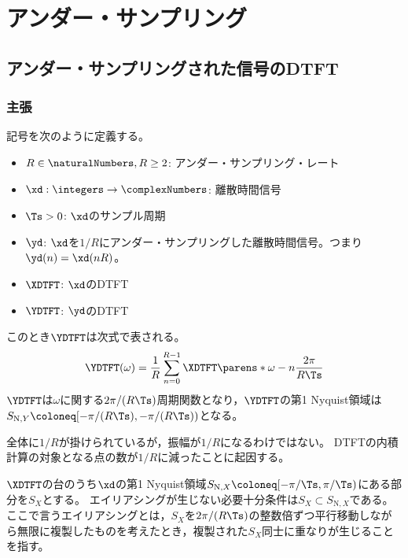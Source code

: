 \chapter{アンダー・サンプリング}
    \section{アンダー・サンプリングされた信号のDTFT}
        \label{アンダー・サンプリングされた信号の DTFT}
        \subsection{主張}
            記号を次のように定義する。
            \begin{itemize}
                \item $R\in\naturalNumbers,R\geq 2$: アンダー・サンプリング・レート
                \item $\xd:\integers\to\complexNumbers$: 離散時間信号
                \item $\Ts>0$: $\xd$のサンプル周期
                \item $\yd$: $\xd$を$1/R$にアンダー・サンプリングした離散時間信号。つまり$\yd(n) = \xd(nR)$。
                \item $\XDTFT$: $\xd$のDTFT
                \item $\YDTFT$: $\yd$のDTFT
            \end{itemize}
            このとき$\YDTFT$は次式で表される。
            \[ \YDTFT(\omega) = \frac{1}{R}\sum_{n=0}^{R-1} \XDTFT\parens*{\omega-n\frac{2\pi}{R\Ts}} \]
            $\YDTFT$は$\omega$に関する$2\pi/(R\Ts)$周期関数となり，$\YDTFT$の第1 Nyquist領域は$S_{\mathrm{N},Y} \coloneq [-\pi/(R\Ts),-\pi/(R\Ts))$となる。
            \par
            全体に$1/R$が掛けられているが，振幅が$1/R$になるわけではない。
            DTFTの内積計算の対象となる点の数が$1/R$に減ったことに起因する。
            \par
            $\XDTFT$の台のうち$\xd$の第1 Nyquist領域$S_{\mathrm{N},X} \coloneq [-\pi/\Ts, \pi/\Ts)$にある部分を$S_X$とする。
            エイリアシングが生じない必要十分条件は$S_X\subset S_{\mathrm{N},X}$である。
            ここで言うエイリアシングとは，$S_X$を$2\pi/(R\Ts)$の整数倍ずつ平行移動しながら無限に複製したものを考えたとき，複製された$S_X$同士に重なりが生じることを指す。
